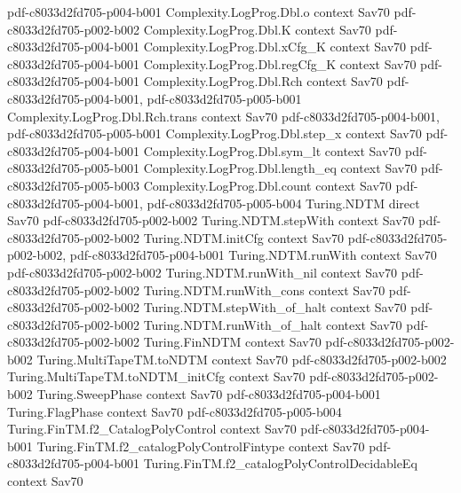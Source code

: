 \begin{theorem}
{    pdf-c8033d2fd705-p004-b001}
\proofstep
  {Complexity.LogProg.Dbl.o}
  {context}
  {Sav70}
  {pdf-c8033d2fd705-p002-b002}
\proofstep
  {Complexity.LogProg.Dbl.K}
  {context}
  {Sav70}
  {pdf-c8033d2fd705-p004-b001}
\proofstep
  {Complexity.LogProg.Dbl.xCfg_K}
  {context}
  {Sav70}
  {pdf-c8033d2fd705-p004-b001}
\proofstep
  {Complexity.LogProg.Dbl.regCfg_K}
  {context}
  {Sav70}
  {pdf-c8033d2fd705-p004-b001}
\proofstep
  {Complexity.LogProg.Dbl.Rch}
  {context}
  {Sav70}
  {pdf-c8033d2fd705-p004-b001,
    pdf-c8033d2fd705-p005-b001}
\proofstep
  {Complexity.LogProg.Dbl.Rch.trans}
  {context}
  {Sav70}
  {pdf-c8033d2fd705-p004-b001,
    pdf-c8033d2fd705-p005-b001}
\proofstep
  {Complexity.LogProg.Dbl.step_x}
  {context}
  {Sav70}
  {pdf-c8033d2fd705-p004-b001}
\proofstep
  {Complexity.LogProg.Dbl.sym_lt}
  {context}
  {Sav70}
  {pdf-c8033d2fd705-p005-b001}
\proofstep
  {Complexity.LogProg.Dbl.length_eq}
  {context}
  {Sav70}
  {pdf-c8033d2fd705-p005-b003}
\proofstep
  {Complexity.LogProg.Dbl.count}
  {context}
  {Sav70}
  {pdf-c8033d2fd705-p004-b001,
    pdf-c8033d2fd705-p005-b004}
\proofstep
  {Turing.NDTM}
  {direct}
  {Sav70}
  {pdf-c8033d2fd705-p002-b002}
\proofstep
  {Turing.NDTM.stepWith}
  {context}
  {Sav70}
  {pdf-c8033d2fd705-p002-b002}
\proofstep
  {Turing.NDTM.initCfg}
  {context}
  {Sav70}
  {pdf-c8033d2fd705-p002-b002,
    pdf-c8033d2fd705-p004-b001}
\proofstep
  {Turing.NDTM.runWith}
  {context}
  {Sav70}
  {pdf-c8033d2fd705-p002-b002}
\proofstep
  {Turing.NDTM.runWith_nil}
  {context}
  {Sav70}
  {pdf-c8033d2fd705-p002-b002}
\proofstep
  {Turing.NDTM.runWith_cons}
  {context}
  {Sav70}
  {pdf-c8033d2fd705-p002-b002}
\proofstep
  {Turing.NDTM.stepWith_of_halt}
  {context}
  {Sav70}
  {pdf-c8033d2fd705-p002-b002}
\proofstep
  {Turing.NDTM.runWith_of_halt}
  {context}
  {Sav70}
  {pdf-c8033d2fd705-p002-b002}
\proofstep
  {Turing.FinNDTM}
  {context}
  {Sav70}
  {pdf-c8033d2fd705-p002-b002}
\proofstep
  {Turing.MultiTapeTM.toNDTM}
  {context}
  {Sav70}
  {pdf-c8033d2fd705-p002-b002}
\proofstep
  {Turing.MultiTapeTM.toNDTM_initCfg}
  {context}
  {Sav70}
  {pdf-c8033d2fd705-p002-b002}
\proofstep
  {Turing.SweepPhase}
  {context}
  {Sav70}
  {pdf-c8033d2fd705-p004-b001}
\proofstep
  {Turing.FlagPhase}
  {context}
  {Sav70}
  {pdf-c8033d2fd705-p005-b004}
\proofstep
  {Turing.FinTM.f2_CatalogPolyControl}
  {context}
  {Sav70}
  {pdf-c8033d2fd705-p004-b001}
\proofstep
  {Turing.FinTM.f2_catalogPolyControlFintype}
  {context}
  {Sav70}
  {pdf-c8033d2fd705-p004-b001}
\proofstep
  {Turing.FinTM.f2_catalogPolyControlDecidableEq}
  {context}
  {Sav70}

\end{theorem}
